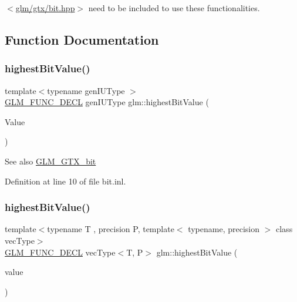 $<$\mbox{\hyperlink{bit_8hpp}{glm/gtx/bit.\+hpp}}$>$ need to be included to use these functionalities. 

\subsection{Function Documentation}
\mbox{\label{group__gtx__bit_ga0dcc8fe7c3d3ad60dea409281efa3d05}} 
\subsubsection{\texorpdfstring{highestBitValue()}{highestBitValue()}\hspace{0.1cm}{\footnotesize\ttfamily [1/2]}}
{\footnotesize\ttfamily template$<$typename gen\+I\+U\+Type $>$ \\
\mbox{\hyperlink{setup_8hpp_ab2d052de21a70539923e9bcbf6e83a51}{G\+L\+M\+\_\+\+F\+U\+N\+C\+\_\+\+D\+E\+CL}} gen\+I\+U\+Type glm\+::highest\+Bit\+Value (\begin{DoxyParamCaption}\item[{gen\+I\+U\+Type}]{Value }\end{DoxyParamCaption})}

\begin{DoxySeeAlso}{See also}
\mbox{\hyperlink{group__gtx__bit}{G\+L\+M\+\_\+\+G\+T\+X\+\_\+bit}} 
\end{DoxySeeAlso}


Definition at line 10 of file bit.\+inl.

\mbox{\label{group__gtx__bit_ga5eea3a4d429040af13d39a7d7cd84d73}} 
\subsubsection{\texorpdfstring{highestBitValue()}{highestBitValue()}\hspace{0.1cm}{\footnotesize\ttfamily [2/2]}}
{\footnotesize\ttfamily template$<$typename T , precision P, template$<$ typename, precision $>$ class vec\+Type$>$ \\
\mbox{\hyperlink{setup_8hpp_ab2d052de21a70539923e9bcbf6e83a51}{G\+L\+M\+\_\+\+F\+U\+N\+C\+\_\+\+D\+E\+CL}} vec\+Type$<$T, P$>$ glm\+::highest\+Bit\+Value (\begin{DoxyParamCaption}\item[{vec\+Type$<$ T, P $>$ const \&}]{value }\end{DoxyParamCaption})}

